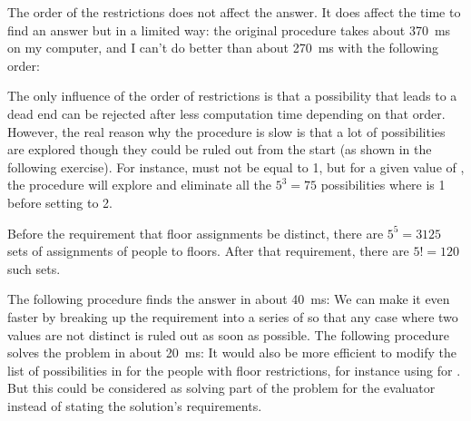 \begin{exe}[4.39]
    The order of the restrictions does not affect the answer. It does affect the 
    time to find an answer but in a limited way: the original procedure takes 
    about 370~ms on my computer, and I can’t do better than about 270~ms with 
    the following order:

    The only influence of the order of restrictions is that a possibility that 
    leads to a dead end can be rejected after less computation time depending on 
    that order. However, the real reason why the procedure is slow is that a lot 
    of possibilities are explored though they could be ruled out from the start 
    (as shown in the following exercise). For instance,  must not 
    be equal to 1, but for a given value of , the procedure will 
    explore and eliminate all the $5^3 = 75$ possibilities where  
    is 1 before setting  to 2.
\end{exe}

\begin{exe}[4.40]
    Before the requirement that floor assignments be distinct, there are $5^5 
    = 3125$ sets of assignments of people to floors. After that requirement, 
    there are $5! = 120$ such sets.

    The following procedure finds the answer in about 40~ms:
    We can make it even faster by breaking up the
     requirement into a series of
     so that any case where two values are not 
    distinct is ruled out as soon as possible. The following procedure solves 
    the problem in about 20~ms:
    It would also be more efficient to modify the list of possibilities in 
     for the people with floor restrictions, for instance using 
     for . But this could be considered as 
    solving part of the problem for the evaluator instead of stating the 
    solution’s requirements.
\end{exe}

